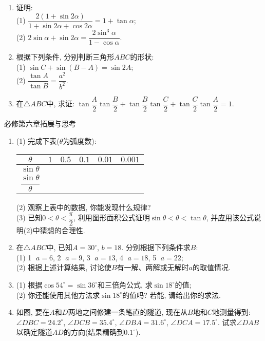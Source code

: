 \documentclass[10pt,a4paper]{article}
\begin{document}
\begin{enumerate}[1.]
\item 证明:\\
(1) $\dfrac{2(1+\sin 2\alpha)}{1+\sin 2\alpha+\cos 2\alpha}=1+\tan \alpha$;\\
(2) $2\sin \alpha+\sin 2\alpha=\dfrac{2\sin^3\alpha}{1-\cos \alpha}$.
\item 根据下列条件, 分别判断三角形$ABC$的形状:\\
(1) $\sin C+\sin (B-A)=\sin 2A$;\\
(2) $\dfrac{\tan A}{\tan B}=\dfrac{a^2}{b^2}$.
\item 在$\triangle ABC$中, 求证: $\tan \dfrac A2\tan \dfrac B2+\tan \dfrac B2\tan\dfrac C2+\tan\dfrac C2\tan\dfrac A2=1$.
\end{enumerate}

必修第六章拓展与思考
\begin{enumerate}[1.]
\item (1) 完成下表($\theta$为弧度数):
\begin{center}
\begin{tabular}{|c|p{}<{\centering}|p{}<{\centering}|p{}<{\centering}|p{}<{\centering}|p{}<{\centering}|}
    \hline
    $\theta$ & $1$ & $0.5$ & $0.1$ & $0.01$ & $0.001$\\ \hline
    $\sin\theta$ & & & & &\\ \hline
    $\dfrac{\sin\theta}{\theta}$ & & & & &\\ \hline
\end{tabular}
\end{center}
(2) 观察上表中的数据, 你能发现什么规律?\\
(3) 已知$0<\theta <\dfrac \pi 2$, 利用图形面积公式证明$\sin \theta <\theta <\tan \theta$, 并应用该公式说明(2)中猜想的合理性.
\item 在$\triangle ABC$中, 已知$A=30^\circ$, $b=18$. 分别根据下列条件求$B$:\\
(1) \textcircled{1} $a=6$, \textcircled{2} $a=9$, \textcircled{3} $a=13$, \textcircled{4} $a=18$, \textcircled{5} $a=22$;\\
(2) 根据上述计算结果, 讨论使$B$有一解、两解或无解时$a$的取值情况.
\item (1) 根据$\cos 54^\circ=\sin 36^\circ$和三倍角公式, 求$\sin 18^\circ$的值;\\
(2) 你还能使用其他方法求$\sin 18^\circ$的值吗? 若能, 请给出你的求法.
\item 如图, 要在$A$和$D$两地之间修建一条笔直的隧道, 现在从$B$地和$C$地测量得到: $\angle DBC=24.2^\circ$, $\angle DCB=35.4^\circ$, $\angle DBA=31.6^\circ$, $\angle DCA=17.5^\circ$. 试求$\angle DAB$以确定隧道$AD$的方向(结果精确到$0.1^\circ$).
\begin{center}
\end{center}
\end{enumerate}
\end{document}
